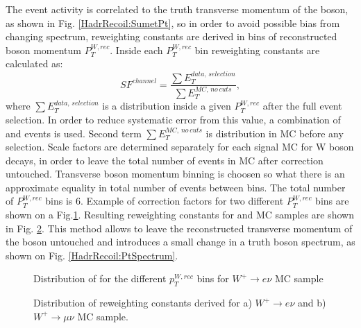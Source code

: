 The event activity \sumet is correlated to the truth transverse momentum of the boson, as shown in Fig. \ref{HadrRecoil:SumetPt}, so in order to avoid possible bias from changing \ptw spectrum, reweighting constants are derived in bins of reconstructed boson momentum $P_T^{W, rec}$. Inside each $P_T^{W, rec}$ bin reweighting constants are calculated as:
\begin{equation}
SF^{channel}=\frac{\sum E_T^{data, \, selection} }{\sum E_T^{MC,\, no\, cuts} },
\end{equation}
where $\sum E_T^{data,\, selection} $ is a \sumet distribution inside a given $P_T^{W, rec}$ after the full event selection. In order to reduce systematic error from this value, a combination of \wenu and \wmunu events is used.  Second term $\sum E_T^{MC,\, no\, cuts}$ is  \sumet distribution in MC before any selection. Scale factors are determined separately for each signal MC for W boson decays, in order to leave the total number of events in MC after correction untouched. Transverse boson momentum binning is choosen so what there is an approximate equality in total number of events between bins. The total number of $P_T^{W, rec}$ bins is 6.
Example of correction factors for two different $P_T^{W, rec}$ bins are shown on a Fig.\ref{ris:SumEtCorPtW}. Resulting reweighting constants for \wenu and \wmunu MC samples are shown in Fig. \ref{ris:SumEtCorNoPol}. This method allows to leave the reconstructed transverse momentum of the boson untouched and introduces a small change in a truth boson spectrum, as shown on Fig. \ref{HadrRecoil:PtSpectrum}.

\begin{figure}[!tbp]
\begin{minipage}[h]{0.49\linewidth}
\end{minipage}
\hfill
\begin{minipage}[h]{0.49\linewidth}
\end{minipage}
\caption{Distribution of \sumet for the different $p_T^{W, rec}$ bins for $W^{+} \to e \nu$ MC sample}
\label{ris:SumEtCorPtW}
\end{figure}

\begin{figure}[!tbp]
\begin{minipage}[h]{0.49\linewidth}
\end{minipage}
\hfill
\begin{minipage}[h]{0.49\linewidth}
\end{minipage}
\caption{Distribution of \sumet reweighting constants derived for a) $W^{+} \to e \nu$ and b) $W^{+} \to \mu \nu$ MC sample.}
\label{ris:SumEtCorNoPol}
\end{figure}

